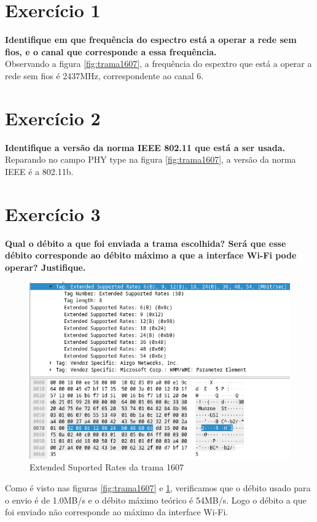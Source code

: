 \documentclass[a4paper]{report}
\begin{document}
\section{Exercício 1}
\textbf{Identifique em que frequência do espectro está a operar a rede sem fios,
e o canal que corresponde a essa frequência.}\\
Observando a figura \ref{fig:trama1607}, a frequência do espextro que está a
operar a rede sem fios é 2437MHz, correspondente ao canal 6.

\section{Exercício 2}
\textbf{Identifique a versão da norma IEEE 802.11 que está a ser usada.}\\
Reparando no campo PHY type na figura \ref{fig:trama1607}, a versão da norma
IEEE é a 802.11b.

\section{Exercício 3}
\textbf{Qual o débito a que foi enviada a trama escolhida? Será que esse débito
corresponde ao débito máximo a que a interface Wi-Fi pode operar?
Justifique.}

\begin{figure}[H]
    \centering 
    \includegraphics[width=\textwidth]{images/maxDataRateEx3.png}  
    \caption{Extended Suported Rates da trama 1607}
    \label{fig:maxDataRateEx3}
\end{figure}
Como é visto nas figuras \ref{fig:trama1607} e \ref{fig:maxDataRateEx3}, verificamos
que o débito usado para o envio é de 1.0MB/s e o débito máximo teórico é 54MB/s.
Logo o débito a que foi enviado não corresponde ao máximo da interface Wi-Fi.
\end{document}
